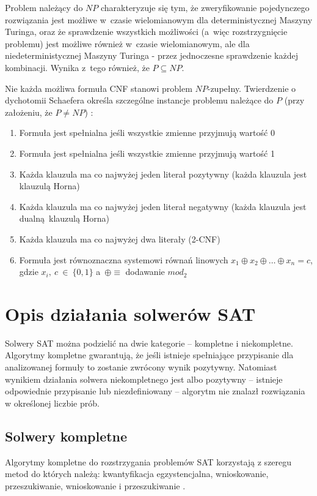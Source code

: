 Problem należący do $NP$ charakteryzuje się tym, że zweryfikowanie pojedynczego rozwiązania jest możliwe w~czasie wielomianowym
dla deterministycznej Maszyny Turinga, oraz że sprawdzenie wszystkich możliwości (a~więc rozstrzygnięcie problemu) jest możliwe
również w~czasie wielomianowym, ale dla niedeterministycznej Maszyny Turinga - przez jednoczesne sprawdzenie każdej kombinacji. 
Wynika z~tego również, że $P \subseteq NP$.

Nie każda możliwa formuła CNF stanowi problem $NP$-zupełny. Twierdzenie o dychotomii Schaefera określa 
szczególne instancje problemu należące do $P$ (przy założeniu, że $P \neq NP$) \cite{schaefer-dichotomy}:

\begin{enumerate}
    \item Formuła jest spełnialna jeśli wszystkie zmienne przyjmują wartość 0
    \item Formuła jest spełnialna jeśli wszystkie zmienne przyjmują wartość 1
    \item Każda klauzula ma co najwyżej jeden literał pozytywny (każda klauzula jest klauzulą Horna)
    \item Każda klauzula ma co najwyżej jeden literał negatywny (każda klauzula jest dualną klauzulą Horna)
    \item Każda klauzula ma co najwyżej dwa literały (2-CNF)
    \item Formuła jest równoznaczna systemowi równań linowych $x_1 \oplus x_2 \oplus \dots \oplus x_n = c$, gdzie
    $x_i,~c~\in~\{0, 1\}$ a~$\oplus \equiv$ dodawanie $mod_2$
    
\end{enumerate}

\section{Opis działania solwerów SAT}
Solwery SAT można podzielić na dwie kategorie -- kompletne i niekompletne.
Algorytmy kompletne gwarantują, że jeśli istnieje spełniające przypisanie dla analizowanej formuły to zostanie zwrócony wynik pozytywny.
Natomiast wynikiem działania solwera niekompletnego jest albo pozytywny -- istnieje odpowiednie przypisanie lub niezdefiniowany -- algorytm nie
znalazł rozwiązania w określonej liczbie prób.

\subsection{Solwery kompletne}
Algorytmy kompletne do rozstrzygania problemów SAT korzystają z szeregu metod do których należą: 
kwantyfikacja egzystencjalna, wnioskowanie, przeszukiwanie, wnioskowanie i przeszukiwanie \cite{handbook-satifiability-complete}.
